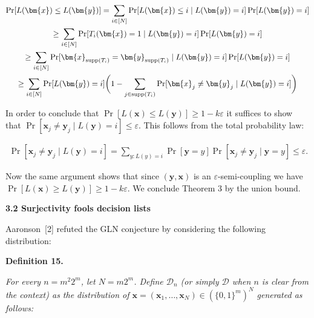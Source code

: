 \[\begin{gathered}
\displaystyle\Pr[L(\bm{x})\leq L(\bm{y})] \displaystyle=\sum_{i\in[N]}\Pr[L(\bm{x})\leq i\mid L(\bm{y})=i]\Pr[L(\bm{y})=i] \\
\displaystyle\geq\sum_{i\in[N]}\Pr[T_{i}(\bm{x})=1\mid L(\bm{y})=i]\Pr[L(\bm{y})=i] \\
\displaystyle\geq\sum_{i\in[N]}\Pr[\bm{x}_{\mathrm{supp}(T_{i})}=\bm{y}_{\mathrm{supp}(T_{i})}\mid L(\bm{y})=i]\Pr[L(\bm{y})=i] \\
\displaystyle\geq\sum_{i\in[N]}\Pr[L(\bm{y})=i]\bigg{(}1-\sum_{j\in\mathrm{supp}(T_{i})}\Pr[\bm{x}_{j}\neq\bm{y}_{j}\mid L(\bm{y})=i]\bigg{)}
\end{gathered}\]


In order to conclude that $\Pr[L(\bm{x})\leq L(\bm{y})]\geq 1-k\varepsilon$ it suffices to show that $\Pr[\bm{x}_{j}\neq\bm{y}_{j}\mid L(\bm{y})=i]\leq\varepsilon$. This follows from the total probability law:\par


\[\begin{gathered}
\Pr[\bm{x}_{j}\neq\bm{y}_{j}\mid L(\bm{y})=i]=\sum_{y\colon L(y)=i}\Pr[\bm{y}=y]\Pr[\bm{x}_{j}\neq\bm{y}_{j}\mid\bm{y}=y]\leq\varepsilon.
\end{gathered}\]


Now the same argument shows that since $(\bm{y},\bm{x})$ is an $\varepsilon$-semi-coupling we have $\Pr[L(\bm{x})\geq L(\bm{y})]\geq 1-k\varepsilon$. We conclude Theorem 3 by the union bound.\par





\par\medskip\noindent\textbf{
3.2 Surjectivity fools decision lists}\par




Aaronson [2] refuted the GLN conjecture by considering the following distribution:\par





\par\medskip\noindent\textbf{
\textbf{Definition 15}\textbf{.}
}\par



\emph{For every $n=m^{2}2^{m}$, let $N=m2^{m}$.
Define $\mathcal{D}_{n}$ (or simply $\mathcal{D}$ when $n$ is clear from the context) as the distribution of $\bm{x}=(\bm{x}_{1},\ldots,\bm{x}_{N})\in(\{0,1\}^{m})^{N}$ generated as follows:}\par


